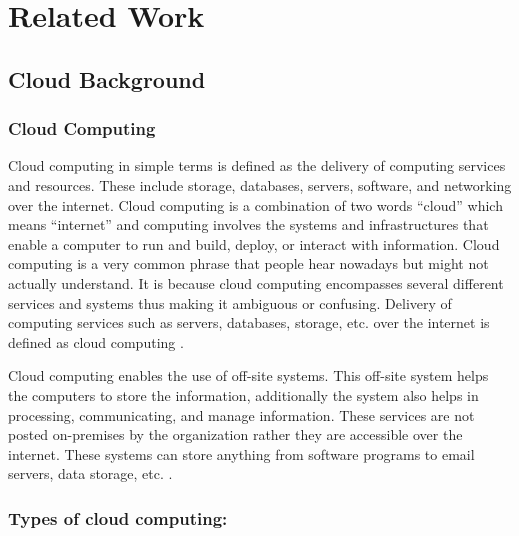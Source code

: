 
\chapter{Related Work}

\section{Cloud Background}

\subsection{Cloud Computing}
Cloud computing in simple terms is defined as the delivery of computing services and resources.
These include
storage, databases, servers, software, and networking over the internet.
Cloud computing is a combination of two
words “cloud” which means “internet” and computing involves the systems and infrastructures that enable a computer to run and build, deploy, or interact with information.
Cloud computing is a very common phrase that people hear nowadays but might not actually understand.
It is because cloud computing encompasses several different services and systems thus making it ambiguous or confusing.
Delivery of computing services such as servers, databases, storage, etc.
over the internet is defined as cloud computing \cite{11}.

Cloud computing enables the use of off-site systems.
This
off-site system helps the computers to store the
information, additionally the system also helps in
processing, communicating, and
manage information.
These services are not posted on-premises by the
organization rather they are accessible over the internet.
These systems can store anything from software programs
to email servers, data storage, etc. \cite{12}.

\subsection{Types of cloud computing:}

